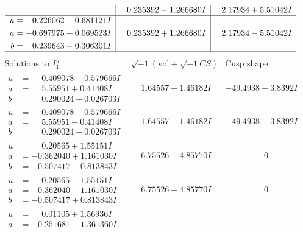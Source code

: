 \documentclass[1p]{elsarticle_modified}
\theoremstyle{definition}
\newcommand{\I}{\sqrt{-1}}
\begin{document}
$$\begin{array}{c|c|c}
 & \phantom{-}0.235392 - 1.266680 I & \phantom{-}2.17934 + 5.51042 I \\ \hline\begin{aligned}
u &= \phantom{-}0.226062 - 0.681121 I \\
a &= -0.697975 + 0.069523 I \\
b &= \phantom{-}0.239643 - 0.306301 I\end{aligned}
 & \phantom{-}0.235392 + 1.266680 I & \phantom{-}2.17934 - 5.51042 I\\
 \hline 
 \end{array}$$\newpage$$\begin{array}{c|c|c}  
\text{Solutions to }I^u_{1}& \I (\text{vol} + \sqrt{-1}CS) & \text{Cusp shape}\\
 \hline 
\begin{aligned}
u &= \phantom{-}0.409078 + 0.579666 I \\
a &= \phantom{-}5.55951 + 0.41408 I \\
b &= \phantom{-}0.290024 - 0.026703 I\end{aligned}
 & \phantom{-}1.64557 - 1.46182 I & -49.4938 - 3.8392 I \\ \hline\begin{aligned}
u &= \phantom{-}0.409078 - 0.579666 I \\
a &= \phantom{-}5.55951 - 0.41408 I \\
b &= \phantom{-}0.290024 + 0.026703 I\end{aligned}
 & \phantom{-}1.64557 + 1.46182 I & -49.4938 + 3.8392 I \\ \hline\begin{aligned}
u &= \phantom{-}0.20565 + 1.55151 I \\
a &= -0.362040 + 1.161030 I \\
b &= -0.507417 - 0.813843 I\end{aligned}
 & \phantom{-}6.75526 - 4.85770 I & \phantom{-0.000000 } 0 \\ \hline\begin{aligned}
u &= \phantom{-}0.20565 - 1.55151 I \\
a &= -0.362040 - 1.161030 I \\
b &= -0.507417 + 0.813843 I\end{aligned}
 & \phantom{-}6.75526 + 4.85770 I & \phantom{-0.000000 } 0 \\ \hline\begin{aligned}
u &= \phantom{-}0.01105 + 1.56936 I \\
a &= -0.251681 - 1.361360 I \\

\end{aligned}
\end{array}$$
\end{document}
